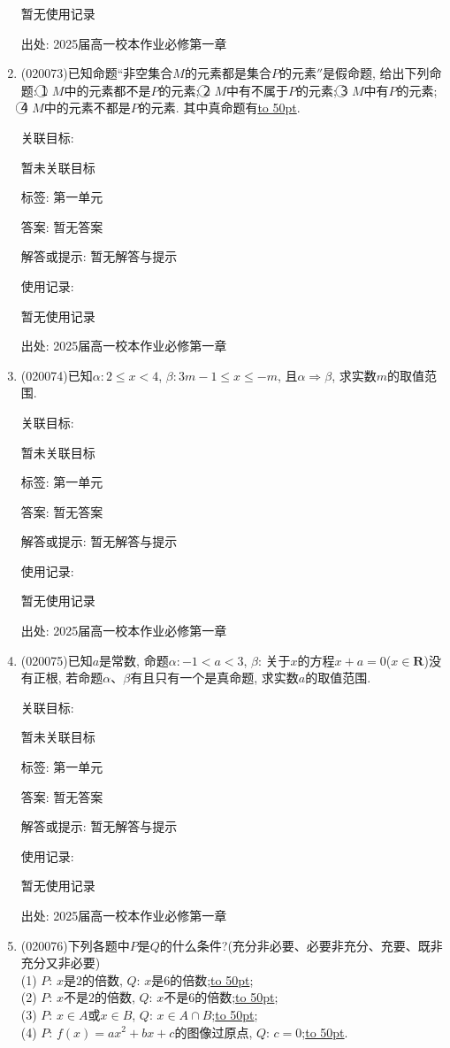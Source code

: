 \documentclass[10pt,a4paper]{article}
\newcommand{\blank}[1]{\underline{\hbox to #1pt{}}}
\begin{document}
\begin{enumerate}[1.]
暂无使用记录


出处: 2025届高一校本作业必修第一章
\item { (020073)}已知命题``非空集合$M$的元素都是集合$P$的元素$''$是假命题, 给出下列命题: \textcircled{1} $M$中的元素都不是$P$的元素; \textcircled{2} $M$中有不属于$P$的元素; \textcircled{3} $M$中有$P$的元素; \textcircled{4} $M$中的元素不都是$P$的元素. 其中真命题有\blank{50}.


关联目标:

暂未关联目标



标签: 第一单元

答案: 暂无答案

解答或提示: 暂无解答与提示

使用记录:

暂无使用记录


出处: 2025届高一校本作业必修第一章
\item { (020074)}已知$\alpha: 2\le x<4$, $\beta: 3m-1\le x\le-m$, 且$\alpha\Rightarrow\beta$, 求实数$m$的取值范围.


关联目标:

暂未关联目标



标签: 第一单元

答案: 暂无答案

解答或提示: 暂无解答与提示

使用记录:

暂无使用记录


出处: 2025届高一校本作业必修第一章
\item { (020075)}已知$a$是常数, 命题$\alpha :-1<a<3$, $\beta$: 关于$x$的方程$x+a=0$($x\in \mathbf{R}$)没有正根, 若命题$\alpha$、$\beta$有且只有一个是真命题, 求实数$a$的取值范围.


关联目标:

暂未关联目标



标签: 第一单元

答案: 暂无答案

解答或提示: 暂无解答与提示

使用记录:

暂无使用记录


出处: 2025届高一校本作业必修第一章
\item { (020076)}下列各题中$P$是$Q$的什么条件?(充分非必要、必要非充分、充要、既非充分又非必要)\\
(1) $P$: $x$是$2$的倍数, $Q$: $x$是$6$的倍数;\blank{50};\\
(2) $P$: $x$不是$2$的倍数, $Q$: $x$不是$6$的倍数;\blank{50};\\
(3) $P$: $x\in A$或$x\in B$, $Q$: $x\in A\cap B$;\blank{50};\\
(4) $P$: $f(x)=ax^2+bx+c$的图像过原点, $Q$: $c=0$;\blank{50}.



\end{enumerate}
\end{document}
